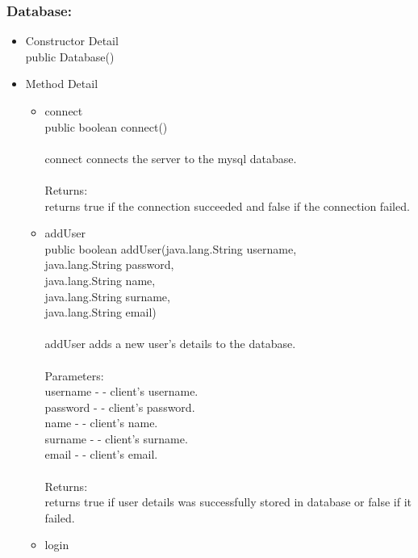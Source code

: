 \documentclass[letterpaper]{article}
\begin{document}
				\subsubsection*{Database:}
				\vspace{0.1in}	
					\begin{itemize}
						\item	Constructor Detail \\
								public Database()
						\item	Method Detail
								\begin{itemize}
									\item	connect \\
											public boolean connect() \\ \\
											connect connects the server to the mysql database. \\ \\
											Returns: \\
											returns true if the connection succeeded and false if the connection failed.
									\item	addUser \\
											public boolean addUser(java.lang.String username, \\
		              java.lang.String password, \\
		              java.lang.String name, \\
		              java.lang.String surname, \\
		              java.lang.String email) \\ \\
											addUser adds a new user's details to the database. \\ \\
											Parameters: \\
											username - - client's username. \\
											password - - client's password. \\
											name - - client's name. \\ 
											surname - - client's surname. \\
											email - - client's email. \\ \\
											Returns: \\
											returns true if user details was successfully stored in database or false if it failed.
									\item	login \\

\end{itemize}
\end{itemize}
\end{document}
